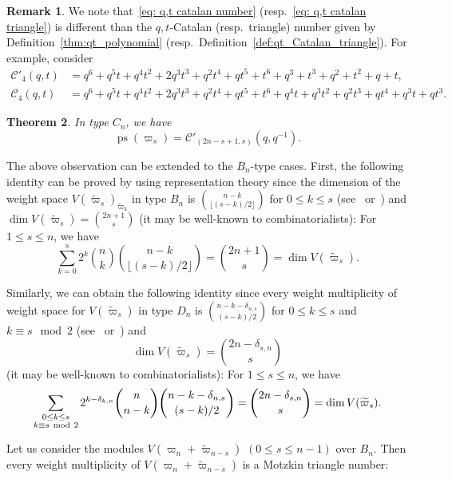 \documentclass[11pt, leqno]{amsart}
\theoremstyle{plain}
\newtheorem{theorem}{Theorem}[section]
\theoremstyle{definition}
\newtheorem{remark}[theorem]{Remark}
\numberwithin{equation}{section}
\newcommand{\fw}{\varpi} %
\newcommand{\tfw}{\widetilde{\fw}} %
\newcommand{\Cat}{\mathcal{C}} %
\newcommand{\ps}{\operatorname{ps}} %
\begin{document}
\begin{remark}
\label{rem:qt_catalan_are_different}
We note that~\eqref{eq: q,t catalan number} (resp.~\eqref{eq: q,t catalan triangle}) is different than the $q,t$-Catalan (resp.\ triangle) number given by Definition~\ref{thm:qt_polynomial} (resp.~Definition~\ref{def:qt_Catalan_triangle}). For example, consider
\begin{align*}
\Cat'_4(q,t) & = q^6 + q^5 t + q^4 t^2 + 2 q^3 t^3 + q^2 t^4 + q t^5 + t^6 + q^3 + t^3 + q^2 + t^2 + q + t,
\\ \Cat_4(q,t) & = q^6 + q^5 t + q^4 t^2 + 2 q^3 t^3 + q^2 t^4 + q t^5 + t^6 + q^4 t + q^3 t^2 + q^2 t^3 + q t^4 + q^3 t + q t^3.
\end{align*}
\end{remark}

\begin{theorem}
\label{thm:column_ps_type_C}
In type $C_n$, we have
\[
\ps(\fw_s) = \Cat'_{(2n-s+1,s)}(q,q^{-1}).
\]
\end{theorem}

The above observation can be extended to the $B_n$-type cases. First, the following
identity can be proved by using representation theory since the dimension of the weight space $V(\tfw_s)_{\tfw_k}$ in type $B_n$ 
is $\binom{n-k}{ \lfloor (s-k)/2 \rfloor }$ for $0 \le k \le s$ (see~\cite[Theorem 7.5]{KLO17} or~\cite[Theorem 19.2]{FH91}) and $\dim V(\tfw_s) = \binom{2n+1}{s}$  (it may be well-known to combinatorialists): For $1 \le s \le n$, we have
\[
\sum_{k=0}^{s} 2^k \binom{n}{k}\binom{n-k}{ \lfloor (s-k)/2 \rfloor } = \binom{2n+1}{s}
= \dim V(\tfw_s).
\]

Similarly, we can obtain the following identity since every weight multiplicity of weight space for $V(\tfw_s)$ in type $D_n$
is $\binom{n-k-\delta_{n,s}}{ (s-k)/2 }$ for $0 \le k \le s$ and $k \equiv s   \mod{2} $  (see~\cite[Theorem 7.5]{KLO17} or~\cite[Theorem 19.4]{FH91}) and
\begin{equation}
\label{eq:dim_column_type_D}
\dim V(\tfw_s) = \binom{2n -\delta_{s,n}}{s}
\end{equation}
(it may be well-known to
combinatorialists): For $1 \le s \le n$, we have
\[
\sum_{\substack{0 \le k \le s \\ k \equiv s \ {\rm mod} \ 2 }}
2^{k-\delta_{k,n}} \binom{n}{n-k}\binom{n-k-\delta_{n,s}}{ (s-k)/2 } = \binom{2n -\delta_{s,n}}{s}
= \dim V(\tfw_s).
\]


Let us consider the modules $V(\fw_n+\tfw_{n-s})$ $(0\le s \le n-1)$ over $B_n$. Then every weight multiplicity of $V(\fw_n+\tfw_{n-s})$
is a Motzkin triangle number:
\end{document}
